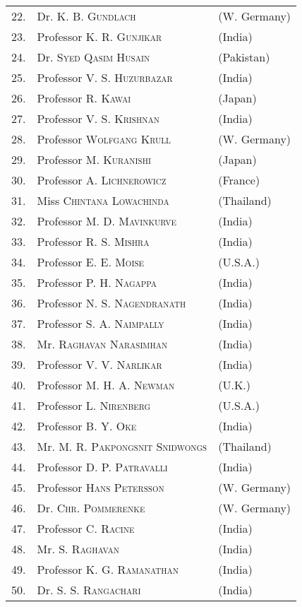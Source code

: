 \begin{longtable}{r@{\;\,}ll}
22. & Dr. \textsc{K. B. Gundlach} & (W. Germany)\\
23. & Professor \textsc{K. R. Gunjikar} & (India)\\
24. & Dr. \textsc{Syed Qasim Husain} & (Pakistan)\\
25. & Professor \textsc{V. S. Huzurbazar} & (India)\\
26. & Professor \textsc{R. Kawai} & (Japan)\\
27. & Professor \textsc{V. S. Krishnan} & (India)\\
28. & Professor \textsc{Wolfgang Krull} & (W. Germany)\\
29. & Professor \textsc{M. Kuranishi} & (Japan)\\
30. & Professor \textsc{A. Lichnerowicz} & (France)\\
31. & Miss \textsc{Chintana Lowachinda} & (Thailand)\\
32. & Professor \textsc{M. D. Mavinkurve} & (India)\\
33. & Professor \textsc{R. S. Mishra} & (India)\\
34. & Professor \textsc{E. E. Moise} & (U.S.A.)\\
35. & Professor \textsc{P. H. Nagappa} & (India)\\
36. & Professor \textsc{N. S. Nagendranath} & (India)\\
37. & Professor \textsc{S. A. Naimpally} & (India)\\
38. & Mr. \textsc{Raghavan Narasimhan} & (India)\\
39. & Professor \textsc{V. V. Narlikar} & (India)\\
40. & Professor \textsc{M. H. A. Newman} & (U.K.)\\
41. & Professor \textsc{L. Nirenberg} & (U.S.A.)\\
42. & Professor \textsc{B. Y. Oke} & (India)\\
43. & Mr. \textsc{M. R. Pakpongsnit Snidwongs} & (Thailand)\\
44. & Professor \textsc{D. P. Patravalli} & (India)\\
45. & Professor \textsc{Hans Petersson} & (W. Germany)\\
46. & Dr. \textsc{Chr. Pommerenke} & (W. Germany)\\
47. & Professor \textsc{C. Racine} & (India)\\
48. & Mr. \textsc{S. Raghavan} & (India)\\
49. & Professor \textsc{K. G. Ramanathan} & (India)\\
50. & Dr. \textsc{S. S. Rangachari} & (India)\\

\end{longtable}
